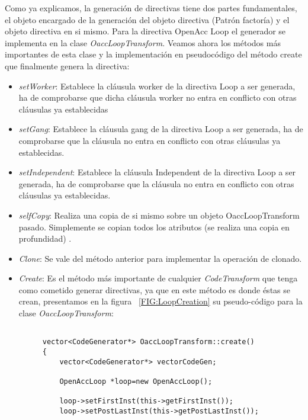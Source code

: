 Como ya explicamos, la generación de directivas tiene dos partes fundamentales, el objeto encargado de la generación del objeto directiva (Patrón factoría) y el objeto directiva en si mismo. Para la directiva OpenAcc Loop el generador se implementa en la clase \textit{OaccLoopTransform}. Veamos ahora los métodos más importantes de esta clase y la implementación en pseudocódigo del método create que finalmente genera la directiva:

\begin{itemize}

\item \textit{setWorker}: Establece la cláusula worker de la directiva Loop a ser generada, ha de comprobarse que dicha cláusula worker no entra en conflicto con otras cláusulas ya establecidas

\item \textit{setGang}: Establece la cláusula gang de la directiva Loop a ser generada, ha de comprobarse que la cláusula no entra en conflicto con otras cláusulas ya establecidas.

\item \textit{setIndependent}: Establece la cláusula Independent de la directiva Loop a ser generada, ha de comprobarse que la cláusula no entra en conflicto con otras cláusulas ya establecidas.

\item \textit{selfCopy}: Realiza una copia de si mismo sobre un objeto OaccLoopTransform pasado. Simplemente se copian todos los atributos (se realiza una copia en profundidad) .

\item \textit{Clone}: Se vale del método anterior para implementar la operación de clonado.

\item \textit{Create}: Es el método más importante de cualquier \textit{CodeTransform} que tenga como cometido generar directivas, ya que en este método es donde éstas se crean, presentamos en la figura ~\ref{FIG:LoopCreation} su pseudo-código para la clase \textit{OaccLoopTransform}:

\begin{figure}[t]
\begin{lstlisting}

vector<CodeGenerator*> OaccLoopTransform::create()
{
	vector<CodeGenerator*> vectorCodeGen;

	OpenAccLoop *loop=new OpenAccLoop();

	loop->setFirstInst(this->getFirstInst());
	loop->setPostLastInst(this->getPostLastInst());


\end{lstlisting}
\end{figure}
\end{itemize}
